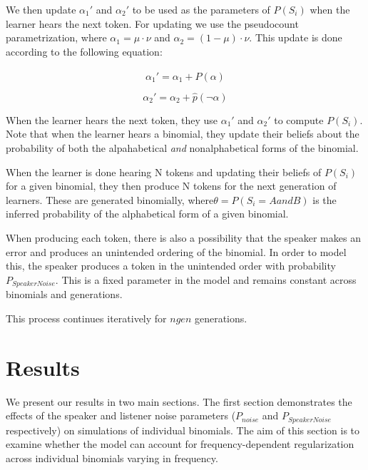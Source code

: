 \documentclass[10pt, letterpaper]{article}
\begin{document}
We then update \(\alpha_1'\) and \(\alpha_2'\) to be used as the
parameters of \(P(S_i)\) when the learner hears the next token. For
updating we use the pseudocount parametrization, where
\(\alpha_1 = \mu \cdot \nu\) and \(\alpha_2 = (1-\mu) \cdot \nu\). This
update is done according to the following equation:

\begin{equation}
\label{eq:alpha1}
\alpha_1' = \alpha_1 + \hat{P}(\alpha)
\end{equation}

\begin{equation}
\label{eq:alpha2}
\alpha_2' = \alpha_2 + \hat{p}(\neg\alpha)
\end{equation}

When the learner hears the next token, they use \(\alpha_1'\) and
\(\alpha_2'\) to compute \(P(S_i)\). Note that when the learner hears a
binomial, they update their beliefs about the probability of both the
alpahabetical \emph{and} nonalphabetical forms of the binomial.

When the learner is done hearing N tokens and updating their beliefs of
\(P(S_i)\) for a given binomial, they then produce N tokens for the next
generation of learners. These are generated binomially,
where\(\theta = P(S_i=AandB)\) is the inferred probability of the
alphabetical form of a given binomial.

When producing each token, there is also a possibility that the speaker
makes an error and produces an unintended ordering of the binomial. In
order to model this, the speaker produces a token in the unintended
order with probability \(P_{SpeakerNoise}\). This is a fixed parameter
in the model and remains constant across binomials and generations.

This process continues iteratively for \(ngen\) generations.

\hypertarget{results}{%
\section{Results}\label{results}}

We present our results in two main sections. The first section
demonstrates the effects of the speaker and listener noise parameters
(\(P_{noise}\) and \(P_{SpeakerNoise}\) respectively) on simulations of
individual binomials. The aim of this section is to examine whether the
model can account for frequency-dependent regularization across
individual binomials varying in frequency.
\end{document}
